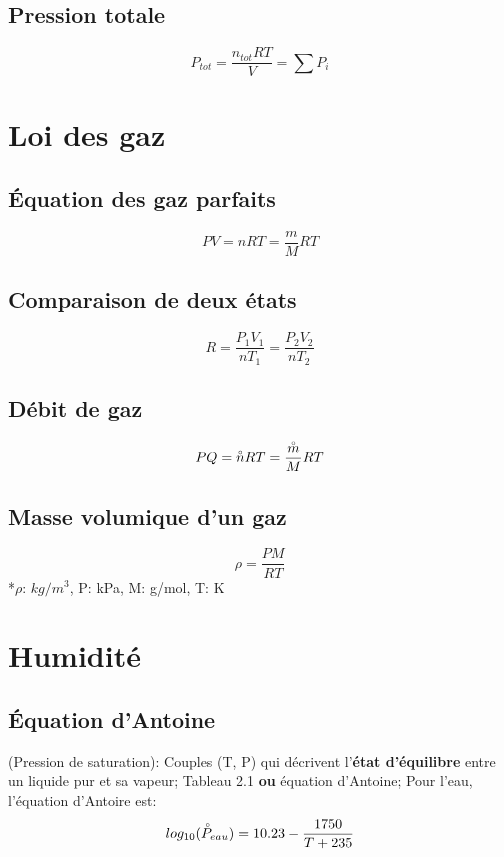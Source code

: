 \documentclass[twocolumn,letterpaper,8pt]{extarticle}
\begin{document}
\subsection{Pression totale}
$$P_{tot}=\frac{n_{tot}RT}{V}=\sum{P_i}$$


\section{Loi des gaz}
\subsection{Équation des gaz parfaits}
$$PV=nRT=\frac{m}{M}RT$$

\subsection{Comparaison de deux états}
$$R=\frac{P_1 V_1}{n T_1}=\frac{P_2 V_2}{n T_2}$$

\subsection{Débit de gaz}
$$PQ=\accentset{\circ}{n}RT=\frac{\accentset{\circ}{m}}{M}RT$$

\subsection{Masse volumique d'un gaz}
$$\rho=\frac{PM}{RT}$$
{\footnotesize
*$\rho$: $kg/m^3$, P: kPa, M: g/mol, T: K
}


\section{Humidité}

\subsection{Équation d'Antoine}
(Pression de saturation): Couples (T, P) qui décrivent l’\textbf{état d’équilibre} entre un liquide pur et sa vapeur;
Tableau 2.1 \textbf{ou} équation d'Antoine; Pour l'eau, l'équation d'Antoire est:
$$log_{10}(\accentset{\circ}{P}_{eau}) = 10.23 - \frac{1750}{T+235}$$
\end{document}
